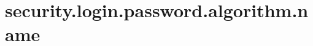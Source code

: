 \section{security.login.password.algorithm.name}
\label{configuration:SecurityLoginPasswordAlgorithmName}
\TODO

